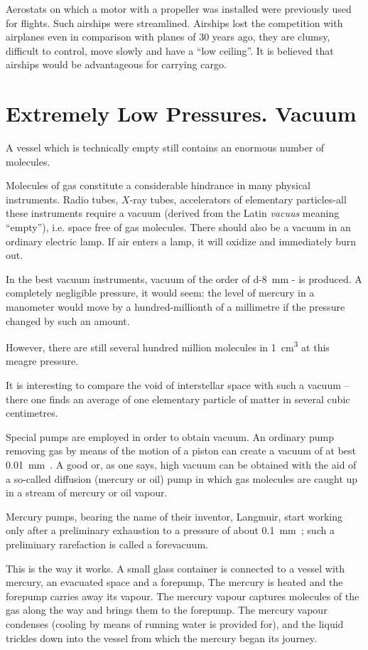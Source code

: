 Aerostats on which a motor with a propeller was installed were previously used for flights. Such airships were streamlined. Airships lost the competition with airplanes even in comparison with planes of 30 years ago, they are clumsy, difficult to control, move slowly and have a ``low ceiling''. It is believed that airships would be advantageous for carrying cargo.


\section{Extremely Low Pressures. Vacuum}
A vessel which is technically empty still contains an enormous number of molecules.

Molecules of gas constitute a considerable hindrance in many physical instruments. Radio tubes, $X$-ray tubes,
accelerators of elementary particles-all these instruments require a vacuum (derived from the Latin \emph{vacuus}
meaning ``empty''), i.e. space free of gas molecules. There should also be a vacuum in an ordinary electric lamp. If air enters a lamp, it will oxidize and immediately burn out.

In the best vacuum instruments, vacuum of the order of \SI{d-8}{\milli\meter} -\si{\mercury} is produced. A completely negligible pressure, it would seem: the level of mercury in a manometer would move by a hundred-millionth of a millimetre if the pressure changed by such an amount. 

However, there are still several hundred million molecules in \SI{1}{\centi\meter\cubed} at this meagre pressure.

It is interesting to compare the void of interstellar space with such a vacuum -- there one finds an average of one elementary particle of matter in several cubic centimetres.

Special pumps are employed in order to obtain vacuum. An ordinary pump removing gas by means of the motion of a piston can create a vacuum of at best \SI{0.01}{\milli\meter\mercury}. A good or, as one says, high vacuum can be obtained with the aid of a so-called diffusion (mercury or oil) pump in which gas molecules are caught up in a stream of mercury or oil vapour.

Mercury pumps, bearing the name of their inventor, Langmuir, start working only after a preliminary exhaustion to a pressure of about \SI{0.1}{\milli\meter\mercury}; such a preliminary rarefaction is called a forevacuum.

This is the way it works. A small glass container is connected to a vessel with mercury, an evacuated space and a forepump, The mercury is heated and the forepump carries away its vapour. The mercury vapour captures molecules of the gas along the way and brings them to the forepump. The mercury vapour condenses (cooling by means of running water is provided for), and the liquid
trickles down into the vessel from which the mercury began its journey.

